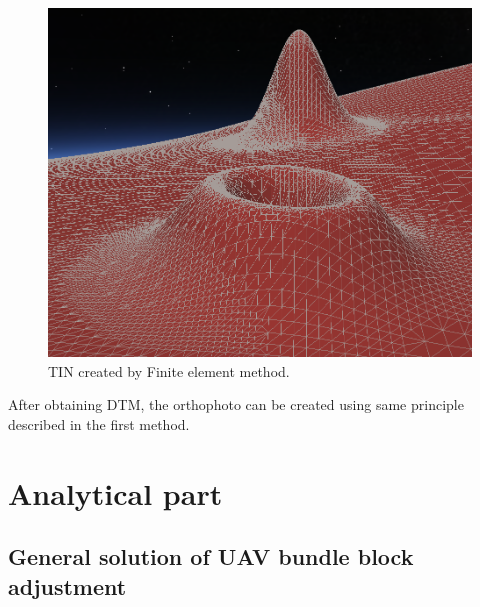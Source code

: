 \documentclass[a4paper,12pt]{article}
\begin{document}
\begin{figure}[h]
    \centering
    \includegraphics[scale=0.2]{figures/finite_elements.png}
    \caption{TIN created by Finite element method.}
    \label{fig:fnt_elems}
\end{figure}

After obtaining DTM, the orthophoto can be created using same principle described in the first method. 

\newpage
\section{Analytical part}

\subsection{General solution of UAV bundle block adjustment}
\label{sec:solution}


\end{document}
